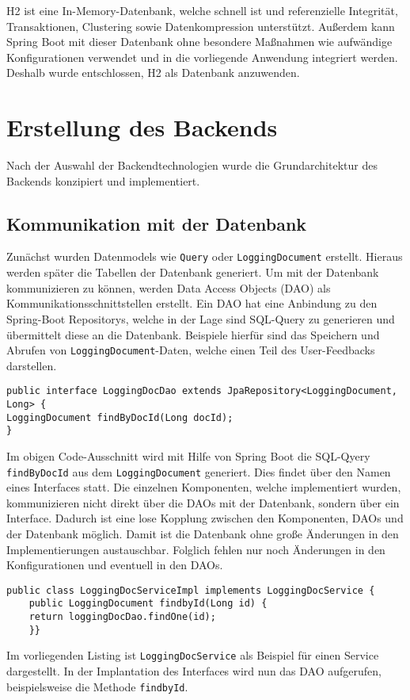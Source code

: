 H2 ist eine In-Memory-Datenbank, welche schnell ist und referenzielle Integrität, Transaktionen, Clustering sowie  Datenkompression unterstützt.
Außerdem kann Spring Boot mit dieser Datenbank ohne besondere Maßnahmen wie aufwändige Konfigurationen verwendet und in die vorliegende Anwendung integriert werden.
Deshalb wurde entschlossen, H2 als Datenbank anzuwenden.

\section{Erstellung des Backends}
Nach der Auswahl der Backendtechnologien wurde die Grundarchitektur des Backends konzipiert und implementiert.

\subsection{Kommunikation mit der Datenbank}
Zunächst wurden Datenmodels wie \texttt{Query} oder \texttt{LoggingDocument} erstellt. 
Hieraus werden später die Tabellen der Datenbank generiert.
Um mit der Datenbank kommunizieren zu können, werden Data Access Objects (DAO) als Kommunikationsschnittstellen erstellt. 
Ein DAO hat eine Anbindung zu den Spring-Boot Repositorys, welche in der Lage sind SQL-Query zu generieren und übermittelt diese an die Datenbank.
Beispiele hierfür sind das Speichern und Abrufen von \texttt{LoggingDocument}-Daten, welche einen Teil des User-Feedbacks darstellen.
\begin{lstlisting}
public interface LoggingDocDao extends JpaRepository<LoggingDocument, Long> {
LoggingDocument findByDocId(Long docId);
}
\end{lstlisting}

Im obigen Code-Ausschnitt wird mit Hilfe von Spring Boot die SQL-Qyery \texttt{findByDocId} aus dem \texttt{LoggingDocument} generiert.
Dies findet über den Namen eines Interfaces statt.
Die einzelnen Komponenten, welche implementiert wurden, kommunizieren nicht direkt über die DAOs mit der Datenbank, sondern über ein Interface.
Dadurch ist eine lose Kopplung zwischen den Komponenten, DAOs und der Datenbank möglich.
Damit ist die Datenbank ohne große Änderungen in den Implementierungen austauschbar. 
Folglich fehlen nur noch Änderungen in den Konfigurationen und eventuell in den DAOs.
 
\begin{lstlisting}
public class LoggingDocServiceImpl implements LoggingDocService {
	public LoggingDocument findbyId(Long id) {
	return loggingDocDao.findOne(id);
	}}
\end{lstlisting}
Im vorliegenden Listing ist \texttt{LoggingDocService} als Beispiel für einen Service dargestellt.
In der Implantation des Interfaces wird nun das DAO aufgerufen, beispielsweise die Methode \texttt{findbyId}.

